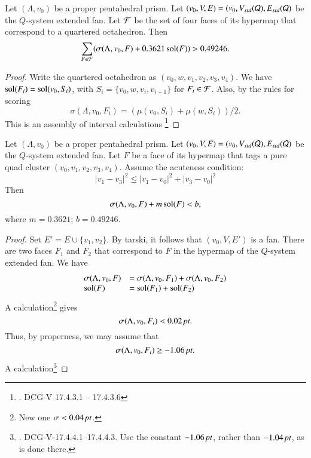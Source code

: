 \begin{lemma}
Let $(\Lambda,v_0)$ be a proper pentahedral prism.
Let $(v_0,V,E) = (v_0,V_{std}({\mathcal Q}),E_{std}({\mathcal Q})$ be the $Q$-system
extended fan.
Let ${\mathcal F}$ be the set
of four faces of its hypermap that correspond to a quartered octahedron.
Then
   $$\sum_{F\in{\mathcal F}}(\sigma(\Lambda,v_0,F) + 0.3621 \operatorname{sol}(F)) > 0.49246.$$
\end{lemma}

\begin{proof}
Write the quartered octahedron as $(v_0,w,v_1,v_2,v_3,v_4)$.  We
have $\operatorname{sol}(F_i) = \operatorname{sol}(v_0,S_i)$, with $S_i=\{v_0,w,v_i,v_{i+1}\}$ for
$F_i\in {\mathcal F}$.  Also, by the rules for scoring
  $$\sigma(\Lambda,v_0,F_i) = (\mu(v_0,S_i) + \mu(w,S_i))/2.$$
This is an assembly of interval calculations%
\footnote{. DCG-V 17.4.3.1 -- 17.4.3.6}
\end{proof}

\begin{lemma}
Let $(\Lambda,v_0)$ be a proper pentahedral prism.
Let $(v_0,V,E) = (v_0,V_{std}({\mathcal Q}),E_{std}({\mathcal Q})$ be the $Q$-system
extended fan.
Let $F$ be a face
of its hypermap that tags a pure quad cluster $(v_0,v_1,v_2,v_3,v_4)$.
Assume the acuteness condition:
  $$
  |v_1-v_3|^2 \le |v_1-v_0|^2 + |v_3-v_0|^2
  $$
Then
  $$
  \sigma(\Lambda,v_0,F) + m \operatorname{sol}(F) < b, 
  $$
where $m = 0.3621$; $b = 0.49246$.
\end{lemma}

\begin{proof}
Set $E' = E\cup \{v_1,v_2\}$.  By tarski, it follows
that $(v_0,V,E')$ is a fan.  There are two faces  $F_1$ and $F_2$
that correspond to $F$ in the  hypermap of the $Q$-system extended fan.
We have
 $$
  \begin{array}{lll}
  \sigma(\Lambda,v_0,F) &= \sigma(\Lambda,v_0,F_1) + \sigma(\Lambda,v_0,F_2)\\
   \operatorname{sol}(F) &=\operatorname{sol}(F_1) + \operatorname{sol}(F_2)\\
 \end{array}
 $$
A calculation\footnote{ New one $\sigma < 0.04\,\hbox{\it pt}$.}
gives 
  $$
  \sigma(\Lambda,v_0,F_i) < 0.02\,\hbox{\it pt}.
  $$
Thus, by properness, we may assume that
  $$
  \sigma(\Lambda,v_0,F_i) \ge -1.06\,\hbox{\it pt}.
  $$
A calculation\footnote{. DCG-V-17.4.4.1--17.4.4.3.  
Use the constant $-1.06\,\hbox{\it pt}$, rather than $-1.04\,\hbox{\it pt}$, as is done there.}
\end{proof}


